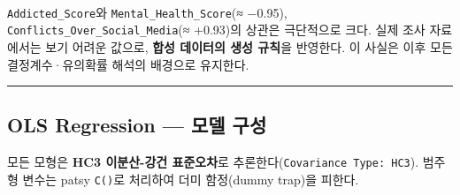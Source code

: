 \documentclass[11pt]{article}
\begin{document}
    \begin{center}
    \end{center}
    { \hspace*{\fill} \\}
    
    \texttt{Addicted\_Score}와 \texttt{Mental\_Health\_Score}(≈ −0.95),
\texttt{Conflicts\_Over\_Social\_Media}(≈ +0.93)의 상관은 극단적으로
크다. 실제 조사 자료에서는 보기 어려운 값으로, \textbf{합성 데이터의
생성 규칙}을 반영한다. 이 사실은 이후 모든 결정계수·유의확률 해석의
배경으로 유지한다.

    \begin{center}\rule{0.5\linewidth}{0.5pt}\end{center}

\hypertarget{ols-regression-uxbaa8uxb378-uxad6cuxc131}{%
\subsection{OLS Regression --- 모델
구성}\label{ols-regression-uxbaa8uxb378-uxad6cuxc131}}

모든 모형은 \textbf{HC3 이분산-강건 표준오차}로
추론한다(\texttt{Covariance\ Type:\ HC3}). 범주형 변수는 patsy
\texttt{C()}로 처리하여 더미 함정(dummy trap)을 피한다.
\end{document}
